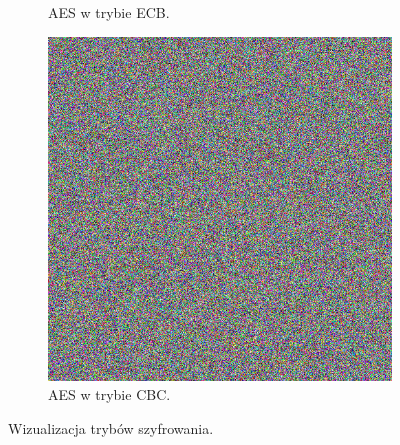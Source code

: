\begin{figure}
\begin{subfigure}{0.3\textwidth}
        \caption{AES w trybie ECB.}
        \label{fig:logo-ecb}
    \end{subfigure}
    \begin{subfigure}{0.3\textwidth}
        \includegraphics[width=\textwidth]{content/images/logo-cbc}
        \caption{AES w trybie CBC.}
        \label{fig:logo-cbc}
    \end{subfigure}
    \caption{Wizualizacja trybów szyfrowania.}
\end{figure} 

